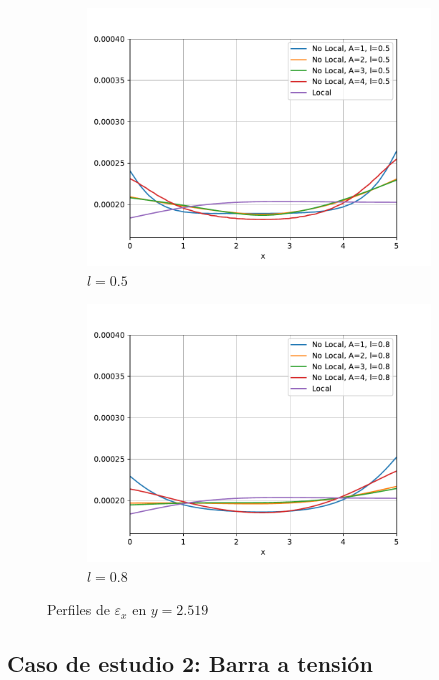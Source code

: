 \begin{figure}
\begin{subfigure}{0.48\textwidth}
		    \centering
		        \includegraphics[width=\textwidth]{figuras/Placa/Perfiles/Y/Y0.5_2.519.pdf}
		        \caption{$l=0.5$}
		        \label{fig:perfilesY0259.05}
		    \end{subfigure}
		    \begin{subfigure}{0.48\textwidth}
		    \centering
		        \includegraphics[width=\textwidth]{figuras/Placa/Perfiles/Y/Y0.8_2.519.pdf}
		        \caption{$l=0.8$}
		        \label{fig:perfilesY0259.08}
		    \end{subfigure}
		    \caption{Perfiles de $\varepsilon_x$ en $y=2.519$}
		    \label{fig:perfilesY0259}
		\end{figure}

\subsection{Caso de estudio 2: Barra a tensión}

